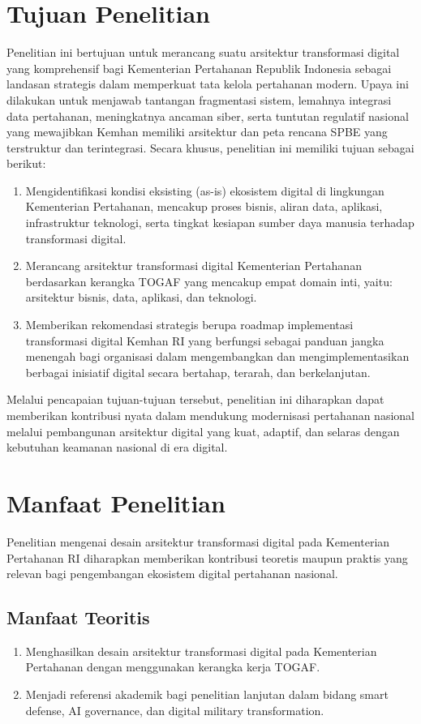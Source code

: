 \section{Tujuan Penelitian}
Penelitian ini bertujuan untuk merancang suatu arsitektur transformasi digital yang komprehensif bagi Kementerian Pertahanan Republik Indonesia sebagai landasan strategis dalam memperkuat tata kelola pertahanan modern.
Upaya ini dilakukan untuk menjawab tantangan fragmentasi sistem, lemahnya integrasi data pertahanan, meningkatnya ancaman siber, serta tuntutan regulatif nasional yang mewajibkan Kemhan memiliki arsitektur dan peta rencana SPBE yang terstruktur dan terintegrasi.
Secara khusus, penelitian ini memiliki tujuan sebagai berikut:
\begin{enumerate}
    \item Mengidentifikasi kondisi eksisting (as-is) ekosistem digital di lingkungan Kementerian Pertahanan, mencakup proses bisnis, aliran data, aplikasi, infrastruktur teknologi,
    serta tingkat kesiapan sumber daya manusia terhadap transformasi digital.
    \item Merancang arsitektur transformasi digital Kementerian Pertahanan berdasarkan kerangka TOGAF yang mencakup empat domain inti,
    yaitu: arsitektur bisnis, data, aplikasi, dan teknologi.
    \item Memberikan rekomendasi strategis berupa roadmap implementasi transformasi digital Kemhan RI yang berfungsi sebagai
    panduan jangka menengah bagi organisasi dalam mengembangkan dan mengimplementasikan berbagai inisiatif digital secara bertahap, terarah, dan berkelanjutan.
\end{enumerate}
Melalui pencapaian tujuan-tujuan tersebut, penelitian ini diharapkan dapat memberikan kontribusi nyata dalam mendukung modernisasi pertahanan nasional
melalui pembangunan arsitektur digital yang kuat, adaptif, dan selaras dengan kebutuhan keamanan nasional di era digital.

\section{Manfaat Penelitian}
Penelitian mengenai desain arsitektur transformasi digital pada Kementerian Pertahanan RI diharapkan memberikan kontribusi teoretis 
maupun praktis yang relevan bagi pengembangan ekosistem digital pertahanan nasional.

\subsection{Manfaat Teoritis}
\begin{enumerate}
    \item Menghasilkan desain arsitektur transformasi digital pada Kementerian Pertahanan dengan menggunakan kerangka kerja TOGAF.
    \item Menjadi referensi akademik bagi penelitian lanjutan dalam bidang smart defense, AI governance, dan digital military transformation.
\end{enumerate}

